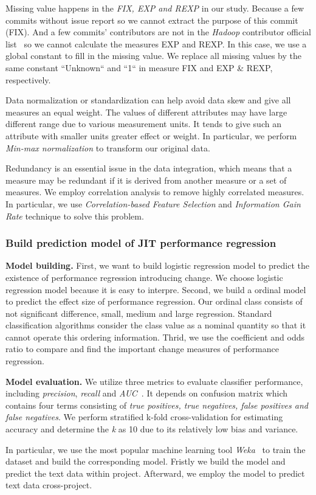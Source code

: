Missing value happens in the \emph{FIX, EXP and REXP} in our study. Because a few commits without issue report so we cannot extract the purpose of this commit (FIX). And a few commits' contributors are not in the \emph{Hadoop} contributor official list~\cite{hadoop_2017} so we cannot calculate the measures EXP and REXP. In this case, we use a global constant to fill in the missing value. We replace all missing values by the same constant ``Unknown`` and ``1`` in measure FIX and EXP \& REXP, respectively.

Data normalization or standardization can help avoid data skew and give all measures an equal weight. The values of different attributes may have large different range due to various measurement units. It tends to give such an attribute with smaller units greater effect or weight. In particular, we perform \emph{Min-max normalization} to transform our original data.

Redundancy is an essential issue in the data integration, which means that a measure may be redundant if it is derived from another measure or a set of measures. We employ correlation analysis to remove highly correlated measures. In particular, we use \emph{Correlation-based Feature Selection} and \emph{Information Gain Rate} technique to solve this problem.

\subsubsection{Build prediction model of JIT performance regression}

\textbf{Model building.} First, we want to build logistic regression model to predict the existence of performance regression introducing change. We choose logistic regression model because it is easy to interpre. Second, we build a ordinal model to predict the effect size of performance regression. Our ordinal class consists of not significant difference, small, medium and large regression. Standard classification algorithms consider the class value as a nominal quantity so that it cannot operate this ordering information. Thrid, we use the coefficient and odds ratio to compare and find the important change measures of performance regression.


\textbf{Model evaluation.} We utilize three metrics to evaluate classifier performance, including \emph{precision}, \emph{recall} and \emph{AUC}~\cite{Fawcett2006ROC}. It depends on confusion matrix which contains four terms consisting of \emph{true positives, true negatives, false positives and false negatives}. 
We perform stratified k-fold cross-validation for estimating accuracy and determine the \emph{k} as 10 due to its relatively low bias and variance.

In particular, we use the most popular machine learning tool \emph{Weka}~\cite{Hall:2009:weka} to train the dataset and build the corresponding model. Fristly we build the model and predict the text data within project. Afterward, we employ the model to predict text data cross-project.

